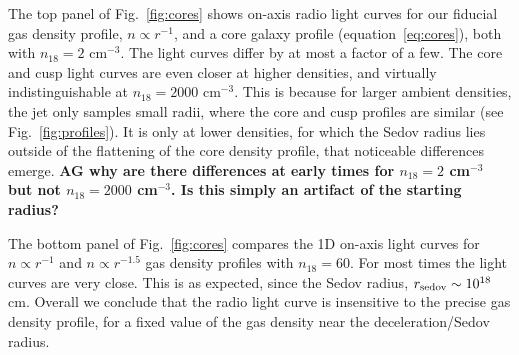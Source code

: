 \documentclass[usenatbib,fleqn]{mnras}
\begin{document}
\label{sec:profileComp}
The top panel of Fig.~\ref{fig:cores} shows on-axis radio light curves
for our fiducial gas density profile, $n\propto r^{-1}$, and a core
galaxy profile (equation~\ref{eq:cores}), both with $n_{18}=2$
cm$^{-3}$.  The light curves differ by at most a factor of a few. The
core and cusp light curves are even closer at higher densities, and
virtually indistinguishable at $n_{18}=2000$ cm$^{-3}$. This is
because for larger ambient densities, the jet only samples small
radii, where the core and cusp profiles are similar (see
Fig.~\ref{fig:profiles}). It is only at lower densities, for which the
Sedov radius lies outside of the flattening of the core density
profile, that noticeable differences emerge. {\bf AG why are there
  differences at early times for $n_{18}=2$ cm$^{-3}$ but not
  $n_{18}=2000$ cm$^{-3}$. Is this simply an artifact of the starting
  radius?}

The bottom panel of Fig.~\ref{fig:cores} compares the 1D on-axis light
curves for $n\propto r^{-1}$ and $n\propto r^{-1.5}$ gas density
profiles with $n_{18}=60$. For most times the light curves are very
close.  This is as expected, since the Sedov radius, $r_{\rm
  sedov}\sim 10^{18}$ cm. Overall we conclude that the radio light
curve is insensitive to the precise gas density profile, for a fixed
value of the gas density near the deceleration/Sedov radius.
\end{document}
